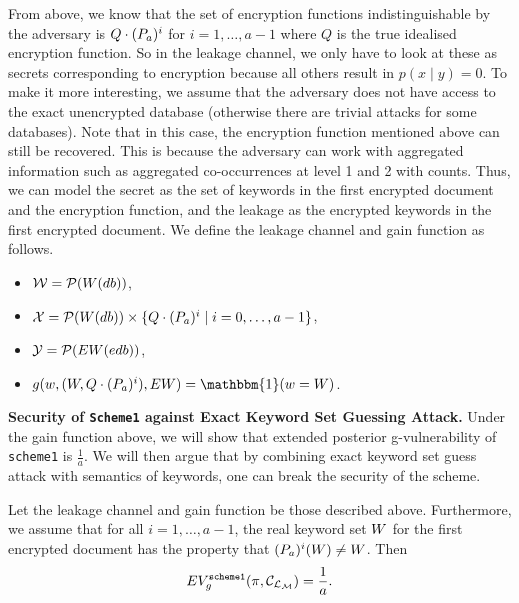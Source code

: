 From above, we know that the set of encryption functions indistinguishable by the adversary is $Q \cdot (P_a)^i$ for $i=1,\dots, a-1$ where $Q$ is the true idealised encryption function. So in the leakage channel, we only have to look at these as secrets corresponding to encryption because all others result in $p(x\mid y) = 0$. To make it more interesting, we assume that the adversary does not have access to the exact unencrypted database (otherwise there are trivial attacks for some databases). Note that in this case, the encryption function mentioned above can still be recovered. This is because the adversary can work with aggregated information such as aggregated co-occurrences at level 1 and 2 with counts. Thus, we can model the secret as the set of keywords in the first encrypted document and the encryption function, and the leakage as the encrypted keywords in the first encrypted document. We define the leakage channel and gain function as follows.
\begin{itemize}
	\item $\mathcal{W} = \mathcal{P}(W(db))$,
	\item $\mathcal{X} = \mathcal{P}(W(db)) \times \{Q \cdot (P_a)^i \mid  i=0,\dots, a-1\}$,
	\item $\mathcal{Y} = \mathcal{P}(EW(edb))$,
	\item $g(w, (\kwset, Q \cdot (\perm_a)^i), \ekwset) = \mathbbm{1}(w = \kwset)$.
\end{itemize}




\textbf{Security of \texttt{Scheme1} against Exact Keyword Set Guessing Attack.} Under the gain function above, we will show that extended posterior g-vulnerability of \texttt{scheme1} is $\frac{1}{a}$. We will then argue that by combining exact keyword set guess attack with semantics of keywords, one can break the security of the scheme.


\begin{theorem}
Let the leakage channel and gain function be those described above. Furthermore, we assume that for all $i = 1, \dots, a-1$, the real keyword set $W$ for the first encrypted document has the property that $(P_a)^i(W) \neq W$. Then
\begin{equation}
	EV_g^{\texttt{scheme1}}(\pi, \mathcal{C}_{\mathcal{L}_\mathcal{M}}) = \frac{1}{a}.
\end{equation}
\end{theorem}

